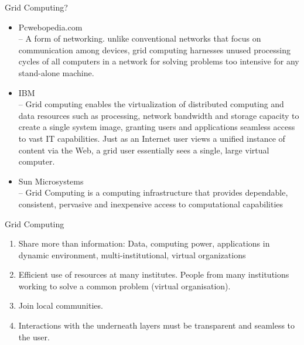 \documentclass{SKP-beamer}
\begin{document}
\begin{frame}{Grid Computing?}
	\begin{itemize}
		\item Pcwebopedia.com \\
		 – A form of networking. unlike conventional networks that focus on communication 
		among devices, grid computing harnesses unused processing cycles of all computers in 
		a network for solving problems too intensive for any stand-alone machine.
		
		\item IBM \\
		– Grid computing enables the virtualization of distributed computing and data resources 
		such as processing, network bandwidth and storage capacity to create a single system 
		image, granting users and applications seamless access to vast IT capabilities. Just as 
		an Internet user views a unified instance of content via the Web, a grid user essentially 
		sees a single, large virtual computer.
		
		
		\item Sun Microsystems \\
		
		– Grid Computing is a computing infrastructure that provides dependable, 
		consistent, pervasive and inexpensive access to computational capabilities
		
		
		
	\end{itemize}
\end{frame}


\begin{frame}{Grid Computing}
	\begin{enumerate}
		
		\item  Share more than information: Data, computing power, applications in 
		dynamic environment, multi-institutional, virtual organizations \\
		\item  Efficient use of resources at many institutes. People from many institutions
		working to solve a common problem (virtual organisation). \\
		\item  Join local communities. \\
		\item  Interactions with the underneath layers must be transparent and seamless 
		to the user.
		
	\end{enumerate}
\end{frame}
\end{document}
